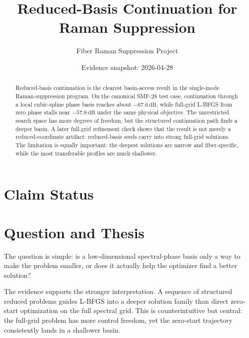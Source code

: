 \documentclass[11pt]{article}
\title{Reduced-Basis Continuation for Raman Suppression}
\author{Fiber Raman Suppression Project}
\date{Evidence snapshot: 2026-04-28}
\begin{document}
\maketitle

\begin{abstract}
Reduced-basis continuation is the clearest basin-access result in the
single-mode Raman-suppression program. On the canonical SMF-28 test case,
continuation through a local cubic-spline phase basis reaches about
\(-67.6\,\mathrm{dB}\), while full-grid L-BFGS from zero phase stalls near
\(-57.8\,\mathrm{dB}\) under the same physical objective. The unrestricted
search space has more degrees of freedom, but the structured continuation path
finds a deeper basin. A later full-grid refinement check shows that the result
is not merely a reduced-coordinate artifact: reduced-basis seeds carry into
strong full-grid solutions. The limitation is equally important: the deepest
solutions are narrow and fiber-specific, while the most transferable profiles
are much shallower.
\end{abstract}

\section*{Claim Status}

\section{Question and Thesis}

The question is simple: is a low-dimensional spectral-phase basis only a way to
make the problem smaller, or does it actually help the optimizer find a better
solution?

The evidence supports the stronger interpretation. A sequence of structured
reduced problems guides L-BFGS into a deeper solution family than direct
zero-start optimization on the full spectral grid. This is counterintuitive but
central: the full-grid problem has more control freedom, yet the zero-start
trajectory consistently lands in a shallower basin.
\end{document}
